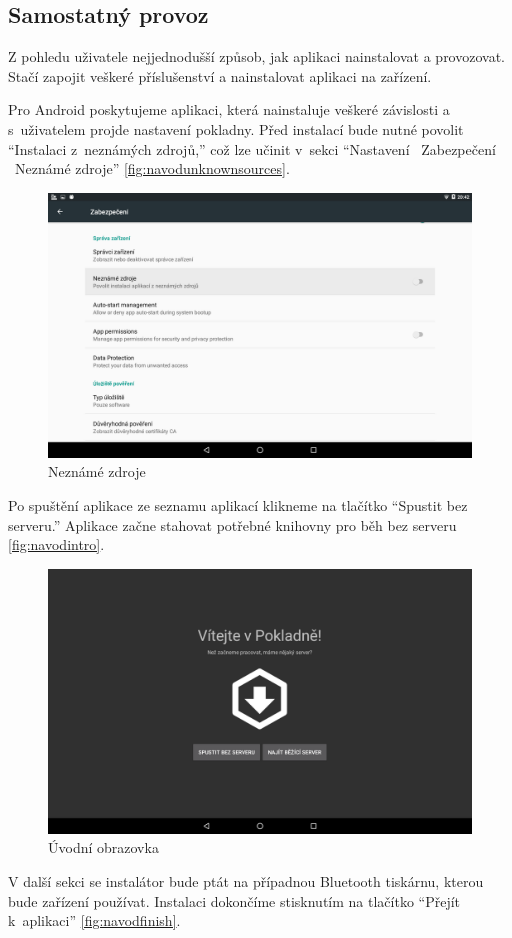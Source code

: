 \documentclass[a4paper,11pt,oneside]{article}
\begin{document}
\subsection{Samostatný provoz}
\label{sec:samostatny}
Z pohledu uživatele nejjednodušší způsob, jak aplikaci nainstalovat a provozovat. Stačí zapojit veškeré příslušenství a nainstalovat aplikaci na zařízení. 

Pro Android poskytujeme aplikaci, která nainstaluje veškeré závislosti a s~uživatelem projde nastavení pokladny. Před instalací bude nutné povolit \enquote{Instalaci z~neznámých zdrojů,} což lze učinit v~sekci \enquote{Nastavení \textrightarrow~Zabezpečení \textrightarrow~Neznámé zdroje} \eqref{fig:navodunknownsources}.

\begin{figure}[H]
	\centering
	\includegraphics[width=0.6\linewidth]{../navod_unknown_sources}
	\caption{Neznámé zdroje}
	\label{fig:navodunknownsources}
\end{figure}

Po spuštění aplikace ze seznamu aplikací klikneme na tlačítko \enquote{Spustit bez serveru.} Aplikace začne stahovat potřebné knihovny pro běh bez serveru \eqref{fig:navodintro}.

\begin{figure}[H]
	\centering
	\includegraphics[width=0.6\linewidth]{../navod_intro}
	\caption{Úvodní obrazovka}
	\label{fig:navodintro}
\end{figure}

V další sekci se instalátor bude ptát na případnou Bluetooth tiskárnu, kterou bude zařízení používat. Instalaci dokončíme stisknutím na tlačítko \enquote{Přejít k~aplikaci} \eqref{fig:navodfinish}.
\end{document}
